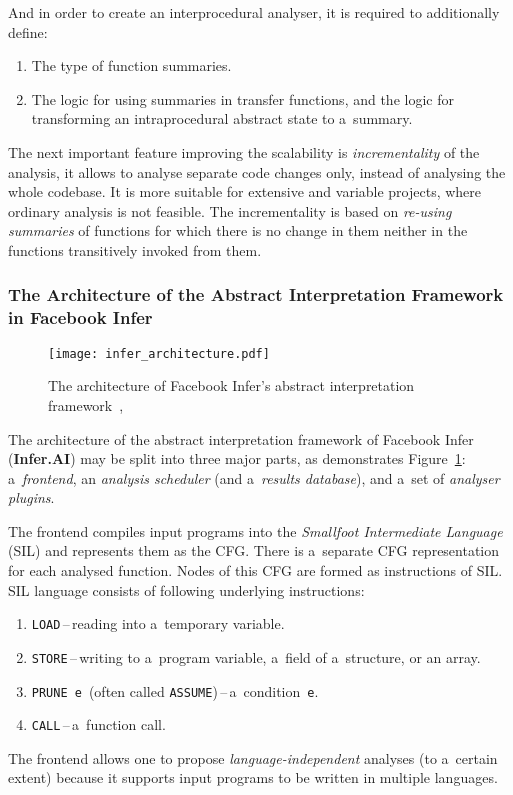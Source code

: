 And in order to create an interprocedural analyser, it is required to
additionally define:
\begin{enumerate}
    \item
        The type of function summaries.

    \item
        The logic for using summaries in transfer functions, and the logic
        for transforming an intraprocedural abstract state to
        a~summary.
\end{enumerate}
The next important feature improving the scalability is
\emph{incrementality} of the analysis, it allows to analyse separate
code changes only, instead of analysing the whole codebase. It is more
suitable for extensive and variable projects, where ordinary analysis
is not feasible. The incrementality is based on \emph{re-using summaries}
of functions for which there is no change in them neither in the functions
transitively invoked from them.

\subsubsection*{
    The Architecture of the Abstract Interpretation Framework in
    Facebook Infer
}

\begin{figure}[hbt]
    \centering
    \texttt{[image: infer\_architecture.pdf]}
    \caption{
        The architecture of Facebook Infer's abstract interpretation
        framework~\cite{inferAISlides}, \cite{projectPracticeMarcin2018}
    }
    \label{fig:inferArchitecture}
\end{figure}

The architecture of the abstract interpretation framework of Facebook
Infer (\textbf{Infer.AI}) may be split into three major parts,
as demonstrates Figure~\ref{fig:inferArchitecture}: a~\emph{frontend},
an \emph{analysis scheduler} (and a~\emph{results database}), and a~set of
\emph{analyser plugins}.

The frontend compiles input programs into the \emph{Smallfoot Intermediate
Language} (SIL) and represents them as the CFG. There is a~separate CFG
representation for each analysed function. Nodes of this CFG are formed as
instructions of SIL. SIL language consists of following underlying
instructions:
\begin{enumerate}
    \item
        \texttt{LOAD}\,--\,reading into a~temporary variable.

    \item
        \texttt{STORE}\,--\,writing to a~program variable,
        a~field of a~structure, or an array.

    \item
        \texttt{PRUNE~e}~(often called
        \texttt{ASSUME})\,--\,a~condition~\texttt{e}.

    \item
        \texttt{CALL}\,--\,a~function call.
\end{enumerate}
The frontend allows one to propose \emph{language-independent} analyses
(to a~certain extent) because it supports input programs to be written
in multiple languages.

